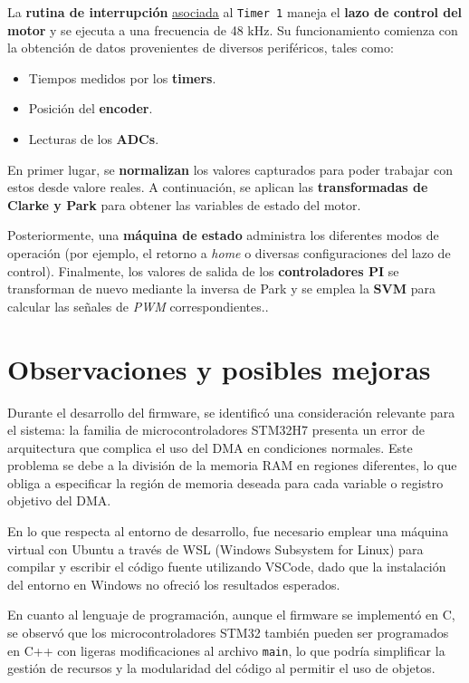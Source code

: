 \documentclass[11pt]{report}
\begin{document}
La \textbf{rutina de interrupción} \href{https://www.youtube.com/watch?v=RJX_jYm8T84}{asociada} al \texttt{Timer 1} maneja el \textbf{lazo de control del motor} y se ejecuta a una frecuencia de 48 kHz. Su funcionamiento comienza con la obtención de datos provenientes de diversos periféricos, tales como:
\begin{itemize}
	\item Tiempos medidos por los \textbf{timers}.
	\item Posición del \textbf{encoder}.
	\item Lecturas de los \textbf{ADCs}.
\end{itemize}
En primer lugar, se \textbf{normalizan} los valores capturados para poder trabajar con estos desde valore reales. A continuación, se aplican las \textbf{transformadas de Clarke y Park} para obtener las variables de estado del motor.

Posteriormente, una \textbf{máquina de estado} administra los diferentes modos de operación (por ejemplo, el retorno a \emph{home} o diversas configuraciones del lazo de control). Finalmente, los valores de salida de los \textbf{controladores PI} se transforman de nuevo mediante la inversa de Park y se emplea la \textbf{SVM} para calcular las señales de \emph{PWM} correspondientes..

\newpage
\section{Observaciones y posibles mejoras}

Durante el desarrollo del firmware, se identificó una consideración relevante para el sistema: la familia de microcontroladores STM32H7 presenta un error de arquitectura que complica el uso del DMA en condiciones normales. Este problema se debe a la división de la memoria RAM en regiones diferentes, lo que obliga a especificar la región de memoria deseada para cada variable o registro objetivo del DMA.

En lo que respecta al entorno de desarrollo, fue necesario emplear una máquina virtual con Ubuntu a través de WSL (Windows Subsystem for Linux) para compilar y escribir el código fuente utilizando VSCode, dado que la instalación del entorno en Windows no ofreció los resultados esperados.

En cuanto al lenguaje de programación, aunque el firmware se implementó en C, se observó que los microcontroladores STM32 también pueden ser programados en C++ con ligeras modificaciones al archivo \texttt{main}, lo que podría simplificar la gestión de recursos y la modularidad del código al permitir el uso de objetos.
\end{document}

